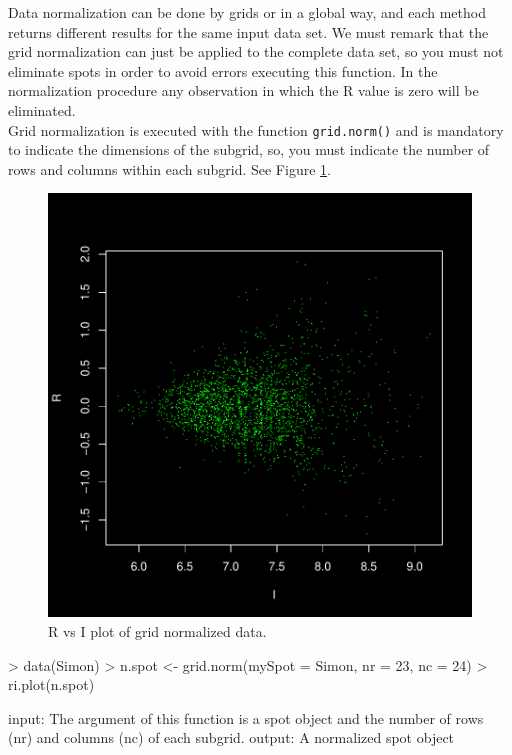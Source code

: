 \documentclass[12pt]{article}
\begin{document}
Data normalization can be done by grids or in a global way, and each method returns different results for the same input data set. We must remark that the grid normalization can just be applied to the complete data set, so you must not eliminate spots in order to avoid errors executing this function.  In the normalization procedure any observation in which the R value is zero will be eliminated.\\

Grid normalization is executed with the function \texttt{grid.norm()} and is mandatory to indicate the dimensions of the subgrid, so, you must indicate the number of rows and columns within each subgrid. See Figure \ref{fig8}.
\begin{figure}[h]
\begin{center}
\includegraphics{example-genArise-010}
\caption{R vs I plot of grid normalized data.\label{fig8}}	
\end{center}
\end{figure}
\begin{Scode}
> data(Simon)
> n.spot <- grid.norm(mySpot = Simon, nr = 23, nc = 24)
> ri.plot(n.spot)
\end{Scode}

\begin{Soutput}
input: The argument of this function is a spot object
       and the number of rows (nr) and columns (nc) of each subgrid.
output: A normalized spot object
\end{Soutput}
\end{document}
